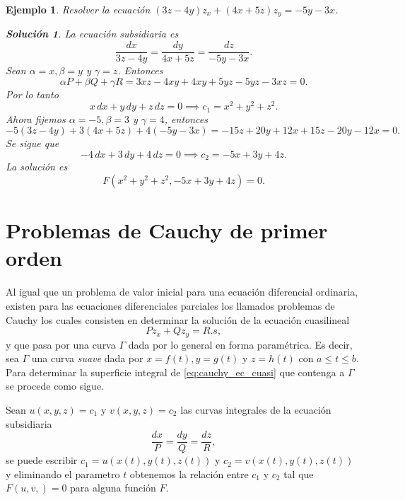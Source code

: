 \documentclass[11pt,letterpaper,draft]{report}
\newtheorem{example}[defn]{Ejemplo}
\newtheorem*{sol}{Solución}
\newcommand\<{\langle}
\renewcommand\>{\rangle}
\begin{document}
\begin{example}
  Resolver la ecuación $(3z-4y) z_x + (4x+5z) z_y = -5y -
  3x$.
  \begin{sol}
    La ecuación subsidiaria es
    \[
    \frac{dx}{3z-4y} = \frac{dy}{4x+5z} = \frac{dz}{-5y-3x}.
    \] 
    Sean $\alpha = x, \beta = y$ y $\gamma = z$. Entonces
    \[
    \alpha P + \beta Q + \gamma R = 3xz - 4xy + 4xy + 5yz -
    5yz - 3xz = 0.
    \] Por lo tanto
    \[
    x \, dx + y \, dy + z \, dz = 0 \implies c_1 = x^2 + y^2
    + z^2.
    \] 
    Ahora fijemos $\alpha = -5, \beta = 3$ y $\gamma = 4$,
    entonces
    \[
    -5(3z-4y) + 3(4x+5z) + 4(-5y-3x) = -15z + 20y + 12x +
    15z - 20y - 12x = 0.
    \]
    Se sigue que
    \[
    -4 \, dx + 3 \, dy + 4 \, dz = 0 \implies c_2 = -5x + 3y
    + 4z.
    \] 
    La solución es
    \[
    F\left(x^2+y^2+z^2, -5x + 3y + 4z\right) = 0.
    \] 
  \end{sol}
\end{example}

\section{Problemas de Cauchy de primer orden}

Al igual que un problema de valor inicial para una ecuación
diferencial ordinaria, existen para las ecuaciones
diferenciales parciales los llamados problemas de Cauchy los
cuales consisten en determinar la solución de la ecuación
cuasilineal
\begin{equation}
  \label{eq:cauchy_ec_cuasi}
  P z_x + Q z_y = R.s,
\end{equation}
y que pasa por una curva $\Gamma$ dada por lo general en
forma paramétrica. Es decir, sea $\Gamma$ una curva
\textit{suave} dada por $x = f(t), y = g(t)$ y $z = h(t)$
con $a \leq t \leq b$. Para determinar la superficie
integral de \ref{eq:cauchy_ec_cuasi} que contenga a $\Gamma$
se procede como sigue.

Sean $u(x,y,z) = c_1$ y $v(x,y,z) = c_2$ las curvas
integrales de la ecuación subsidiaria
\[
\frac{dx}{P} = \frac{dy}{Q} = \frac{dz}{R},
\] 
se puede escribir $c_1 = u(x(t), y(t), z(t))$ y $c_2 =
v(x(t),y(t),z(t))$ y eliminando el parametro $t$ obtenemos
la relación entre $c_1$ y $c_2$ tal que $F(u,v,) = 0$ para
alguna función $F$.
\end{document}

